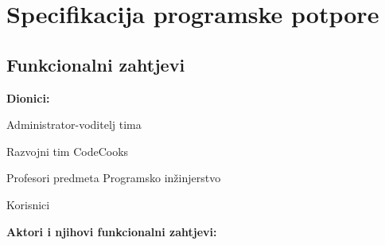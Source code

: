 \chapter{Specifikacija programske potpore}
	
	\section{Funkcionalni zahtjevi}
	
	
	\noindent \textbf{Dionici:}
	
	\begin{packed_enum}
		
		\item Administrator-voditelj tima
		\item Razvojni tim CodeCooks			
		\item Profesori predmeta Programsko inžinjerstvo
		\item Korisnici
		
	\end{packed_enum}
	
	\noindent \textbf{Aktori i njihovi funkcionalni zahtjevi:}
	
